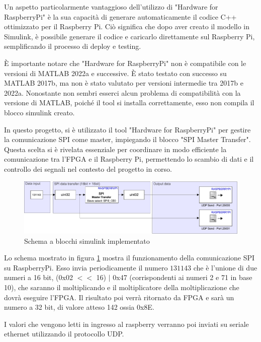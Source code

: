 \documentclass[titlepage]{report}
\begin{document}
		Un aspetto particolarmente vantaggioso dell'utilizzo di "Hardware for RaspberryPi" è la sua capacità di generare automaticamente il codice C++ ottimizzato per il Raspberry Pi. Ciò significa che dopo aver creato il modello in Simulink, è possibile generare il codice e caricarlo direttamente sul Raspberry Pi, semplificando il processo di deploy e testing.
		
		È importante notare che "Hardware for RaspberryPi" non è compatibile con le versioni di MATLAB 2022a e successive. È stato testato con successo su MATLAB 2017b, ma non è stato valutato per versioni intermedie tra 2017b e 2022a. Nonostante non sembri esserci alcun problema di compatibilità con la versione di MATLAB, poiché il tool si installa correttamente, esso non compila il blocco simulink creato.

		In questo progetto, si è utilizzato il tool "Hardware for RaspberryPi" per gestire la comunicazione SPI come master, impiegando il blocco "SPI Master Transfer". Questa scelta si è rivelata essenziale per coordinare in modo efficiente la comunicazione tra l'FPGA e il Raspberry Pi, permettendo lo scambio di dati e il controllo dei segnali nel contesto del progetto in corso.

		\begin{figure}[ht]
			\centering
			\includegraphics[scale=0.6]{./img/test_raspi_psed_single.pdf}
			\caption{Schema a blocchi simulink implementato}
			\label{fig:simulink_sch}
		\end{figure}

		Lo schema mostrato in figura \ref{fig:simulink_sch} mostra il funzionamento della comunicazione SPI su RaspberryPi. Esso invia periodicamente il numero $131143$ che è l'unione di due numeri a 16 bit, (0x02 $<<$ 16) $\mid$ 0x47 (corrispondenti ai numeri 2 e 71 in base 10), che saranno il moltiplicando e il moltiplicatore della moltiplicazione che dovrà eseguire l'FPGA. Il risultato poi verrà ritornato da FPGA e sarà un numero a 32 bit, di valore atteso 142 ossia 0x8E.

		I valori che vengono letti in ingresso al raspberry verranno poi inviati su seriale ethernet utilizzando il protocollo UDP.
\end{document}
